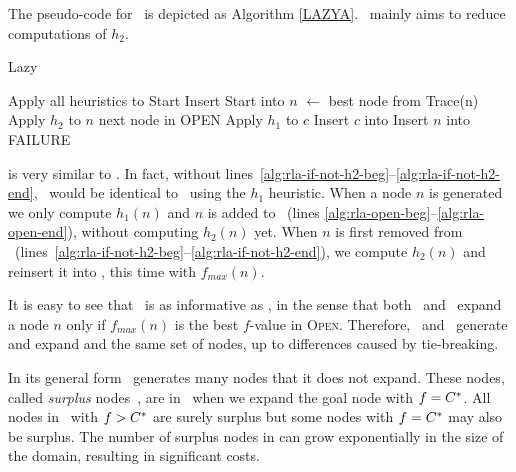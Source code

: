 The pseudo-code for  \lazyastar~is depicted as Algorithm \ref{LAZYA}.
\lazyastar~mainly aims to reduce computations of $h_2$.
\begin{algorithm}[h]
\caption{Lazy \astar}
\begin{algorithmic}[1]
    \State Apply all heuristics to Start
    \State Insert Start into \OPEN
        \State $n$ $\gets$ best node from \OPEN
            \Return Trace(n)
        \EndIf
         \label{alg:rla-if-not-h2-beg}
            \State Apply $h_2$ to $n$
			 \Comment next node in OPEN
        \EndIf                           \label{alg:rla-if-not-h2-end}
                \label{alg:rla-open-beg}
            \State Apply $h_1$ to $c$
            \State Insert $c$ into \OPEN
        \EndFor                          \label{alg:rla-open-end}
        \State Insert $n$ into \CLOSED
    \EndWhile  \\
    \Return FAILURE
\EndProcedure
\end{algorithmic}
\label{LAZYA}
\end{algorithm}
\lazyastar is very similar to \astar.
In fact, without lines~\ref{alg:rla-if-not-h2-beg}--\ref{alg:rla-if-not-h2-end}, \lazyastar~would be identical to
\astar~using the $h_1$ heuristic.
When a node $n$ is generated we only compute $h_1(n)$ and $n$ is added to
\OPEN ~(lines \ref{alg:rla-open-beg}--\ref{alg:rla-open-end}), without computing $h_2(n)$ yet.
When $n$ is first removed from \OPEN~(lines~\ref{alg:rla-if-not-h2-beg}--\ref{alg:rla-if-not-h2-end}), we compute $h_2(n)$ and
reinsert it into \OPEN, this time with $f_{max}(n)$.

It is easy to see that \lazyastar~is as informative as \astarmax, in
the sense that both \astarmax~and \lazyastar~expand a node $n$ only
if $f_{max}(n)$ is the best $f$-value in \textsc{Open}.  Therefore,
\lazyastar~and \astarmax~generate and expand and the same set of
nodes, up to differences caused by tie-breaking.

In its general form \astar~generates many nodes that it does not expand. These
nodes, called {\em surplus} nodes~\cite{Felner2012}, are in \OPEN~when we
expand the goal node with $f=C^\ast$. All nodes in \OPEN~with $f>C^\ast$ are
surely surplus but some nodes with $f=C^\ast$ may also be surplus. The number
of surplus nodes in \OPEN can grow exponentially in the size of the domain, resulting in
significant costs.

